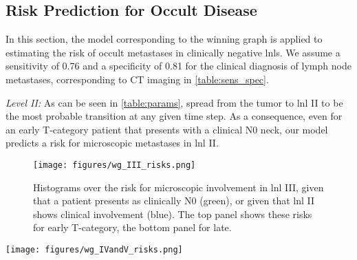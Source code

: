 \documentclass[twocolumn]{aastex631}
\begin{document}
\subsection{Risk Prediction for Occult Disease}
\label{subsec:results:risk_prediction}

In this section, the model corresponding to the winning graph is applied to estimating the risk of occult metastases in clinically negative \glspl{lnl}. We assume a sensitivity of 0.76 and a specificity of 0.81 for the clinical diagnosis of lymph node metastases, corresponding to CT imaging in \autoref{table:sens_spec}.

{\it Level II:} As can be seen in \autoref{table:params}, spread from the tumor to \gls{lnl} II to be the most probable transition at any given time step. As a consequence, even for an early T-category patient that presents with a clinical N0 neck, our model predicts a risk for microscopic metastases in \gls{lnl} II.

\begin{figure}[b]
    \begin{centering}
        \texttt{[image: figures/wg\_III\_risks.png]}
        \caption{Histograms over the risk for microscopic involvement in \gls{lnl} III, given that a patient presents as clinically N0 (green), or given that \gls{lnl} II shows clinical involvement (blue). The top panel shows these risks for early T-category, the bottom panel for late. \label{fig:wg_III_risks}}
    \end{centering}
\end{figure}

\begin{figure*}
    \begin{centering}
        \texttt{[image: figures/wg\_IVandV\_risks.png]}
        \caption{Distributions over the risk for microscopic involvement in \gls{lnl} IV (left panels) and in \gls{lnl} V (right panels) as predicted by the winning graph model, given early (top panels) or advanced T-category (bottom panels), and different CT-based diagnoses: 1) A clinical N0 patient (green histograms), 2) visible metastases in \gls{lnl} II, but otherwise healthy-looking lymph nodes (blue histograms), 3) macroscopic metastases in the \glspl{lnl} II \& III, with the rest of the neck still being clinically node negative (orange histograms), and finally 4) extensive clinical involvement in the levels II, III, and IV (red histograms).\label{fig:wg_IVandV_risks}}
    \end{centering}
\end{figure*}
\end{document}

